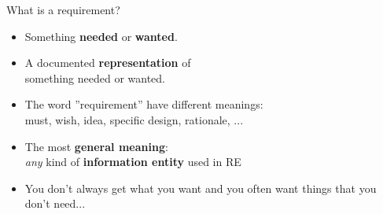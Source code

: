 \begin{Slide}{What is a requirement?}

\begin{itemize}
\item Something \textbf{needed} or \textbf{wanted}.

\item A documented \textbf{representation} of\\something needed or wanted.

\item The word ''requirement'' have different meanings:\\
  must, wish, idea, specific design, rationale, ...

\item The most \textbf{general meaning}:\\
  \textit{any} kind of \textbf{information entity} used in RE

\item You don't always get what you want and you often want things that you don't need...

\end{itemize}
\end{Slide}